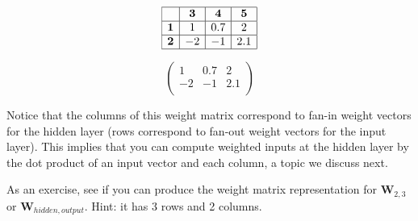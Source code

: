 \begin{minipage}{0.5\textwidth}
\centering
\[
\begin{array}{|c|c|c|c|}
\hline
\multicolumn{1}{|c|}{} & \textbf{3} & \textbf{4} & \textbf{5} \\
\hline
\textbf{1} & 1 & 0.7 & 2 \\
\hline
\textbf{2} & -2 & -1 & 2.1 \\
\hline
\end{array}
\]
\end{minipage}
\begin{minipage}{0.5\textwidth}
\centering
\[
\begin{pmatrix}
1 & 0.7 & 2 \\
-2 & -1 & 2.1 \\
\end{pmatrix}
\]
\end{minipage}
\vspace*{.1cm} 

\noindent Notice that the columns of this weight matrix correspond to fan-in weight vectors for the hidden layer (rows correspond to fan-out weight vectors for the input layer). This implies that you can compute weighted inputs at the hidden layer by the dot product of an input vector and each column, a topic we discuss next.

As an exercise, see if you can produce the weight matrix representation for $\textbf{W}_{2,3}$ or $\textbf{W}_{hidden,output}$. Hint: it has 3 rows and 2 columns. 


